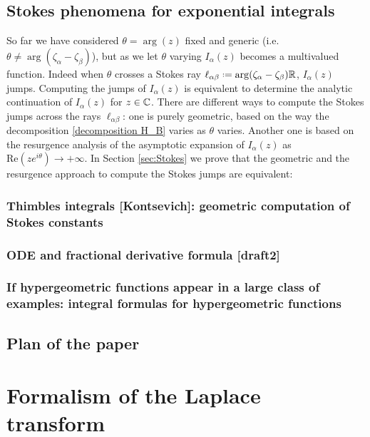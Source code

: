 \documentclass[11pt,a4paper,twoside,leqno,noamsfonts]{amsart}
\numberwithin{equation}{section}
\begin{document}
\subsection{Stokes phenomena for exponential integrals}
So far we have considered $\theta=\arg(z)$ fixed and generic (i.e. $\theta\neq\arg(\zeta_\alpha-\zeta_\beta)$), but as we let $\theta$ varying $I_{\alpha}(z)$ becomes a multivalued function. Indeed when $\theta$ crosses a Stokes ray $\ell_{\alpha\beta}\defeq\arg(\zeta_\alpha-\zeta_\beta)\R$, $I_\alpha(z)$ jumps. Computing the jumps of $I_{\alpha}(z)$ is equivalent to determine the analytic continuation of $I_\alpha(z)$ for $z\in\mathbb C$. There are different ways to compute the Stokes jumps across the rays $\ell_{\alpha\beta}$: one is purely geometric, based on the way the decomposition \eqref{decomposition H_B} varies as $\theta$ varies. Another one is based on the resurgence analysis of the asymptotic expansion of $I_{\alpha}(z)$ as $\mathrm{Re}(z e^{i\theta})\to +\infty$. In Section \ref{sec:Stokes} we prove that the geometric and the resurgence approach to compute the Stokes jumps are equivalent:
\begin{theorem}

\end{theorem}  

    
\subsubsection{Thimbles integrals [Kontsevich]: geometric computation of Stokes constants}



\subsubsection{ ODE and fractional derivative formula [draft2]}

\subsubsection{If hypergeometric functions appear in a large class of examples: integral formulas for hypergeometric functions }

\subsection{Plan of the paper}

\section{Formalism of the Laplace transform}
\end{document}
